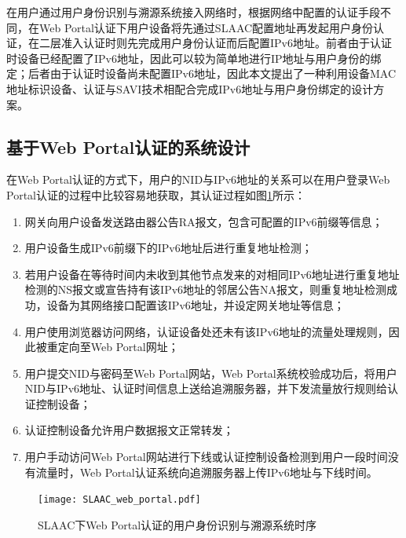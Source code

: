     在用户通过用户身份识别与溯源系统接入网络时，根据网络中配置的认证手段不同，在Web Portal认证下用户设备将先通过SLAAC配置地址再发起用户身份认证，在二层准入认证时则先完成用户身份认证而后配置IPv6地址。前者由于认证时设备已经配置了IPv6地址，因此可以较为简单地进行IP地址与用户身份的绑定；后者由于认证时设备尚未配置IPv6地址，因此本文提出了一种利用设备MAC地址标识设备、认证与SAVI技术相配合完成IPv6地址与用户身份绑定的设计方案。

    \subsection{基于Web Portal认证的系统设计}
    \label{NIDTGA:SLAAC:portal}
    在Web Portal认证的方式下，用户的NID与IPv6地址的关系可以在用户登录Web Portal认证的过程中比较容易地获取，其认证过程如图\ref{fig:SLAAC_web_portal}所示：
    \begin{enumerate}[1{)}]
      \item 网关向用户设备发送路由器公告RA报文，包含可配置的IPv6前缀等信息；
      \item 用户设备生成IPv6前缀下的IPv6地址后进行重复地址检测；
      \item 若用户设备在等待时间内未收到其他节点发来的对相同IPv6地址进行重复地址检测的NS报文或宣告持有该IPv6地址的邻居公告NA报文，则重复地址检测成功，设备为其网络接口配置该IPv6地址，并设定网关地址等信息；
      \item 用户使用浏览器访问网络，认证设备处还未有该IPv6地址的流量处理规则，因此被重定向至Web Portal网址；
      \item 用户提交NID与密码至Web Portal网站，Web Portal系统校验成功后，将用户NID与IPv6地址、认证时间信息上送给追溯服务器，并下发流量放行规则给认证控制设备；
      \item 认证控制设备允许用户数据报文正常转发；
      \item 用户手动访问Web Portal网站进行下线或认证控制设备检测到用户一段时间没有流量时，Web Portal认证系统向追溯服务器上传IPv6地址与下线时间。
    \end{enumerate}

    \begin{figure}[ht]
      \centering
      \texttt{[image: SLAAC\_web\_portal.pdf]}
      \caption{SLAAC下Web Portal认证的用户身份识别与溯源系统时序}
      \label{fig:SLAAC_web_portal}
    \end{figure}

